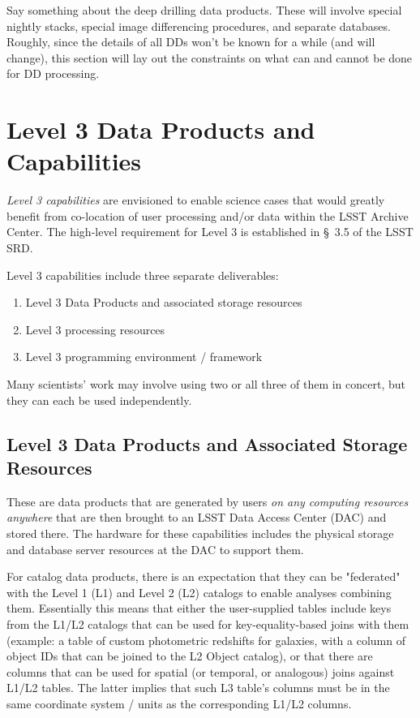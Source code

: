 \documentclass[12pt]{article}
\begin{document}
Say something about the deep drilling data products. These will involve special nightly stacks, special image differencing procedures, and separate databases. Roughly, since the details of all DDs won't be known for a while (and will change), this section will lay out the constraints on what can and cannot be done for DD processing.

\section{Level 3 Data Products and Capabilities}

{\em Level 3 capabilities} are envisioned to enable science cases that would greatly benefit from co-location of user processing and/or data within the LSST Archive Center. The high-level requirement for Level 3 is established in \S~3.5 of the LSST SRD.

Level 3 capabilities include three separate deliverables:
%
\begin{enumerate}
    \item Level 3 Data Products and associated storage resources
    \item Level 3 processing resources
    \item Level 3 programming environment / framework
\end{enumerate}
%
Many scientists' work may involve using two or all three of them in concert, but they can each be used independently.

\subsection{Level 3 Data Products and Associated Storage Resources}

These are data products that are generated by users {\em on any computing resources anywhere} that are then brought to an LSST Data Access Center (DAC) and stored there. The hardware for these capabilities includes the physical storage and database server resources at the DAC to support them.

For catalog data products, there is an expectation that they can be "federated" with the Level 1 (L1) and Level 2 (L2) catalogs to enable analyses combining them.  Essentially this means that either the user-supplied tables include keys from the L1/L2 catalogs that can be used for key-equality-based joins with them (example: a table of custom photometric redshifts for galaxies, with a column of object IDs that can be joined to the L2 Object catalog), or that there are columns that can be used for spatial (or temporal, or analogous) joins against L1/L2 tables. The latter implies that such L3 table's columns must be in the same coordinate system / units as the corresponding L1/L2 columns.
\end{document}
